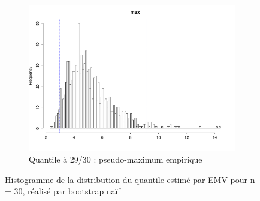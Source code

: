 \documentclass{article}
\renewcommand*{\(}{ \left( }
\renewcommand*{\)}{ \right) }
\begin{document}
\begin{figure}[H]
\begin{subfigure}[t]{0.3\textwidth}
        \includegraphics[width = \linewidth]{img/BootstrapAEMV-Max-30.pdf}
        \caption{Quantile à 29/30 : pseudo-maximum empirique}
        \label{fig:BAEMVMax}
    \end{subfigure}%
    \caption{Histogramme de la distribution du quantile estimé par EMV pour n = 30, réalisé par bootstrap naïf}
    \label{fig:BAEMV}
\end{figure}
\end{document}
